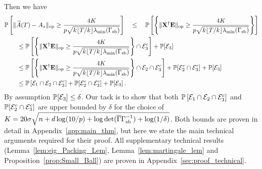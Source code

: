 Then we have
\begin{align*}
  &\mathbb{P}\left[ \lVert \widehat{A}(T) - A_\star \rVert_{\mathrm{op}} \geq \frac{4K}{p\sqrt{k\lfloor T/k\rfloor \lambda_{\min}(\Gamma_{\mathrm{sb}}) }} \right] \quad\leq \quad\mathbb{P}\left[ \left\{\lVert \mathbf{X}^\dagger \mathbf{E} \rVert_{\mathrm{op}} \geq \frac{ 4K}{p\sqrt{k\lfloor T/k\rfloor\lambda_{\min}(\Gamma_{\mathrm{sb}}) }} \right\} \right] \\
  &\qquad\leq \mathbb{P}\left[ \left\{\lVert \mathbf{X}^\dagger \mathbf{E} \rVert_{\mathrm{op}} \geq \frac{ 4K}{p\sqrt{k\lfloor T/k\rfloor\lambda_{\min}(\Gamma_{\mathrm{sb}}) } } \right\} \cap \mathcal{E}_3^c \right] + \mathbb{P}[ \mathcal{E}_3 ] \\
  &\qquad\leq \mathbb{P}\left[ \left\{\lVert \mathbf{X}^\dagger \mathbf{E} \rVert_{\mathrm{op}} \geq \frac{ 4K}{p\sqrt{k\lfloor T/k\rfloor\lambda_{\min}(\Gamma_{\mathrm{sb}}) }} \right\} \cap \mathcal{E}_2 \cap \mathcal{E}_3^c \right] + \mathbb{P}[ \mathcal{E}_2^c \cap \mathcal{E}_3^c] + \mathbb{P}[ \mathcal{E}_3 ] \\
  &\qquad\leq \mathbb{P}\left[ \mathcal{E}_1 \cap \mathcal{E}_2 \cap \mathcal{E}_3^c \right] + \mathbb{P}[ \mathcal{E}_2^c \cap \mathcal{E}_3^c] + \mathbb{P}[ \mathcal{E}_3 ] \:.
\end{align*}
By assumption $\mathbb{P}[\mathcal{E}_3] \leq \delta$. Our task is to show that both $\mathbb{P}\left[ \mathcal{E}_1 \cap \mathcal{E}_2 \cap \mathcal{E}_3^c \right]$ and $\mathbb{P}[ \mathcal{E}_2^c \cap \mathcal{E}_3^c]$ are upper bounded by $\delta$ for the choice of $K =  20\sigma \sqrt{n + d\log(10/p) + \log \det(\overline{\Gamma}\Gamma_{\mathrm{sb}}^{-1}) + \log(1/\delta) }$. Both bounds are proven in detail in Appendix~\ref{app:main_thm}, but here we state the main technical arguments required for their proof. All supplementary technical results (Lemma~\ref{lem:eig_Packing_Lem}, Lemma~\ref{lem:martingale_lem} and Proposition~\ref{prop:Small_Ball}) are proven in Appendix~\ref{sec:proof_technical}.

